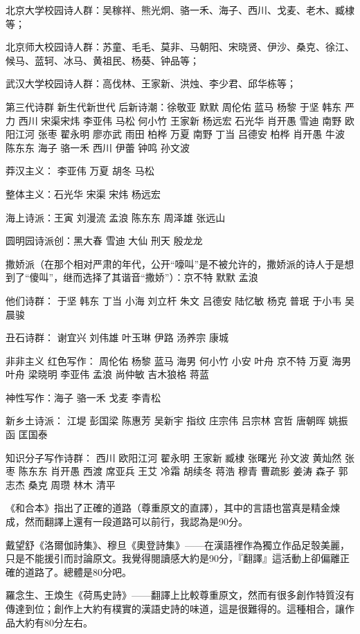 \documentclass[UTF8]{../RepresentationUniverse}
\begin{document}
北京大学校园诗人群：吴稼祥、熊光炯、骆一禾、海子、西川、戈麦、老木、臧棣等；

北京师大校园诗人群：苏童、毛毛、莫非、马朝阳、宋晓贤、伊沙、桑克、徐江、候马、蓝轲、冰马、黄祖民、杨葵、钟品等；

武汉大学校园诗人群：高伐林、王家新、洪烛、李少君、邱华栋等；


第三代诗群 新生代新世代 后新诗潮：徐敬亚 默默 周伦佑 蓝马 杨黎 于坚 韩东 严力 西川 宋渠宋炜 李亚伟 马松 何小竹 王家新 杨远宏 石光华 肖开愚 雪迪 南野 欧阳江河 张枣 翟永明 廖亦武 雨田 柏桦 万夏 南野 丁当 吕德安 柏桦 肖开愚 牛波 陈东东 海子 骆一禾 西川 伊蕾 钟鸣 孙文波

莽汉主义： 李亚伟 万夏 胡冬 马松

整体主义：石光华 宋渠 宋炜 杨远宏

海上诗派：王寅 刘漫流 孟浪 陈东东 周泽雄 张远山

圆明园诗派创：黑大春 雪迪 大仙 刑天 殷龙龙


撒娇派（在那个相对严肃的年代，公开“嚎叫”是不被允许的，撒娇派的诗人于是想到了“傻叫”，继而选择了其谐音“撒娇”）：京不特 默默 孟浪

他们诗群： 于坚 韩东 丁当 小海 刘立杆 朱文 吕德安 陆忆敏 杨克 普珉 于小韦 吴晨骏


丑石诗群： 谢宜兴 刘伟雄 叶玉琳 伊路 汤养宗 康城


非非主义 红色写作： 周伦佑 杨黎 蓝马 海男 何小竹 小安 叶舟 京不特 万夏 海男 叶舟 梁晓明 李亚伟 孟浪 尚仲敏 吉木狼格 蒋蓝


神性写作：海子 骆一禾 戈麦 李青松

新乡土诗派： 江堤 彭国梁 陈惠芳 吴新宇 指纹 庄宗伟 吕宗林 宫哲 唐朝晖 姚振函 匡国泰


知识分子写作诗群： 西川 欧阳江河 翟永明 王家新 臧棣 张曙光 孙文波 黄灿然 张枣 陈东东 肖开愚 西渡 席亚兵 王艾 冷霜 胡续冬 蒋浩 穆青 曹疏影 姜涛 森子 郭志杰 桑克 周瓒 林木 清平

 









《和合本》指出了正確的道路（尊重原文的直譯），其中的言語也當真是精金煉成，然而翻譯上還有一段道路可以前行，我認為是90分。


戴望舒《洛爾伽詩集》、穆旦《奧登詩集》——在漢語裡作為獨立作品足彀美麗，只是不能援引而討論原文。我覺得閱讀感大約是90分，『翻譯』這活動上卻偏離正確的道路了。總體是80分吧。


羅念生、王煥生《荷馬史詩》——翻譯上比較尊重原文，然而有很多創作特質沒有傳達到位；創作上大約有樸實的漢語史詩的味道，這是很難得的。這種相合，讓作品大約有80分左右。
\end{document}
